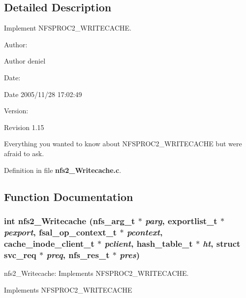 \subsection{Detailed Description}
Implement NFSPROC2\_\-WRITECACHE. 

\begin{Desc}
\item[Author:]\begin{Desc}
\item[Author]deniel \end{Desc}
\end{Desc}
\begin{Desc}
\item[Date:]\begin{Desc}
\item[Date]2005/11/28 17:02:49 \end{Desc}
\end{Desc}
\begin{Desc}
\item[Version:]\begin{Desc}
\item[Revision]1.15 \end{Desc}
\end{Desc}
Everything you wanted to know about NFSPROC2\_\-WRITECACHE but were afraid to ask.

Definition in file {\bf nfs2\_\-Writecache.c}.

\subsection{Function Documentation}
\subsubsection{\setlength{\rightskip}{0pt plus 5cm}int nfs2\_\-Writecache (nfs\_\-arg\_\-t $\ast$ {\em parg}, exportlist\_\-t $\ast$ {\em pexport}, fsal\_\-op\_\-context\_\-t $\ast$ {\em pcontext}, cache\_\-inode\_\-client\_\-t $\ast$ {\em pclient}, hash\_\-table\_\-t $\ast$ {\em ht}, struct svc\_\-req $\ast$ {\em preq}, nfs\_\-res\_\-t $\ast$ {\em pres})}\label{nfs2__Writecache_8c_a0}


nfs2\_\-Writecache: Implements NFSPROC2\_\-WRITECACHE.

Implements NFSPROC2\_\-WRITECACHE

